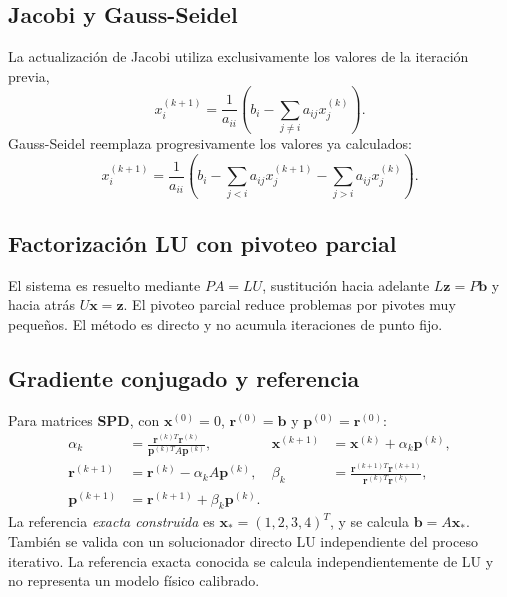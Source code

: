 \documentclass[letterpaper,11pt]{article}
\begin{document}
\subsection{Jacobi y Gauss-Seidel}
La actualización de Jacobi utiliza exclusivamente los valores de la iteración previa,
\begin{equation}\label{eq:jacobi}
x_i^{(k+1)}=\frac{1}{a_{ii}}\left(b_i-\sum_{j\ne i}a_{ij}x_j^{(k)}\right).
\end{equation}
Gauss-Seidel reemplaza progresivamente los valores ya calculados:
\begin{equation}\label{eq:seidel}
x_i^{(k+1)}=\frac{1}{a_{ii}}\left(b_i-\sum_{j<i}a_{ij}x_j^{(k+1)}-\sum_{j>i}a_{ij}x_j^{(k)}\right).
\end{equation}
\subsection{Factorización LU con pivoteo parcial}
El sistema es resuelto mediante $PA=LU$, sustitución hacia adelante $L\boldsymbol{z}=P\boldsymbol{b}$ y hacia atrás $U\boldsymbol{x}=\boldsymbol{z}$. El pivoteo parcial reduce problemas por pivotes muy pequeños. El método es directo y no acumula iteraciones de punto fijo.

\subsection{Gradiente conjugado y referencia}
Para matrices \textbf{SPD}, con $\boldsymbol{x}^{(0)}=0$, $\boldsymbol{r}^{(0)}=\boldsymbol{b}$ y $\boldsymbol{p}^{(0)}=\boldsymbol{r}^{(0)}$:
\begin{align}
\alpha_k&=\frac{\boldsymbol{r}^{(k)T}\boldsymbol{r}^{(k)}}{\boldsymbol{p}^{(k)T}A\boldsymbol{p}^{(k)}},&
\boldsymbol{x}^{(k+1)}&=\boldsymbol{x}^{(k)}+\alpha_k\boldsymbol{p}^{(k)},\\
\boldsymbol{r}^{(k+1)}&=\boldsymbol{r}^{(k)}-\alpha_kA\boldsymbol{p}^{(k)},&
\beta_k&=\frac{\boldsymbol{r}^{(k+1)T}\boldsymbol{r}^{(k+1)}}{\boldsymbol{r}^{(k)T}\boldsymbol{r}^{(k)}},\\
\boldsymbol{p}^{(k+1)}&=\boldsymbol{r}^{(k+1)}+\beta_k\boldsymbol{p}^{(k)}.&&
\end{align}
La referencia \emph{exacta construida} es $\boldsymbol{x}_*=(1,2,3,4)^T$, y se calcula $\boldsymbol{b}=A\boldsymbol{x}_*$. También se valida con un solucionador directo LU independiente del proceso iterativo. La referencia exacta conocida se calcula independientemente de LU y no representa un modelo físico calibrado.
\end{document}

